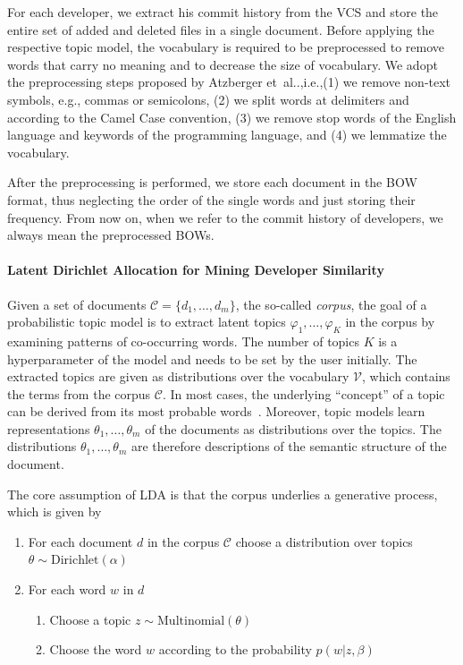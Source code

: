 \documentclass[a4paper,twoside]{article}
\makeatletter
\DeclareRobustCommand\onedot{\futurelet\@let@token\@onedot}
\def\@onedot{\ifx\@let@token.\else.\null\fi\xspace}
\def\etal{et~al\onedot\xspace}
\def\ie{i.e.,\xspace}
\def\eg{e.g.,\xspace}
\makeatother
\begin{document}
For each developer, we extract his commit history from the \ac{VCS} and store the entire set of added and deleted files in a single document.
Before applying the respective topic model, the vocabulary is required to be preprocessed to remove words that carry no meaning and to decrease the size of vocabulary.
We adopt the preprocessing steps proposed by Atzberger \etal \cite{atzberger2021softwareforest},\ie (1) we remove non-text symbols, \eg commas or semicolons, (2) we split words at delimiters and according to the Camel Case convention, (3) we remove stop words of the English language and keywords of the programming language, and (4) we lemmatize the vocabulary.

\noindent After the preprocessing is performed, we store each document in the \ac{BOW} format, thus neglecting the order of the single words and just storing their frequency.
From now on, when we refer to the commit history of developers, we always mean the preprocessed \ac{BOW}s.

\paragraph{Latent Dirichlet Allocation for Mining Developer Similarity}
\label{KM:SubSec:LDA}

Given a set of documents $\mathcal{C} = \{d_1, \dots, d_m\}$, the so-called \textsl{corpus}, the goal of a probabilistic topic model is to extract latent topics $\varphi_1, \dots, \varphi_K$ in the corpus by examining patterns of co-occurring words.
The number of topics $K$ is a hyperparameter of the model and needs to be set by the user initially.
The extracted topics are given as distributions over the vocabulary $\mathcal{V}$, which contains the terms from the corpus $\mathcal{C}$.
In most cases, the underlying \enquote{concept} of a topic can be derived from its most probable words~\cite{markovtsev2017topic}.
Moreover, topic models learn representations $\theta_1, \dots, \theta_m$ of the documents as distributions over the topics.
The distributions $\theta_1, \dots, \theta_m$ are therefore descriptions of the semantic structure of the document.

The core assumption of \ac{LDA} is that the corpus underlies a generative process, which is given by

\begin{enumerate}
    \item For each document $d$ in the corpus $\mathcal{C}$ choose a distribution over topics $\theta \sim \text{Dirichlet}(\alpha)$
    \item For each word $w$ in $d$
    \begin{enumerate}
        \item Choose a topic $z \sim \text{Multinomial}(\theta)$
        \item Choose the word $w$ according to the probability $p(w \vert z, \beta)$
    \end{enumerate}
\end{enumerate}
\end{document}

